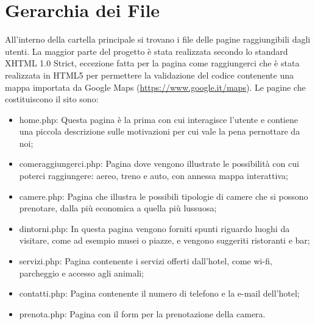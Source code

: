 \section{Gerarchia dei File}
All'interno della cartella principale si trovano i file delle pagine raggiungibili dagli utenti. La maggior parte del progetto è stata realizzata secondo lo standard XHTML 1.0 Strict, eccezione fatta per la pagina come raggiungerci che è stata realizzata in HTML5 per permettere la validazione del codice contenente una mappa importata da Google Maps (\underline{\color{Blue}https://www.google.it/maps}).
Le pagine che costituiscono il sito sono:
\begin{itemize} 
\item home.php: Questa pagina è la prima con cui interagisce l'utente e contiene una piccola descrizione sulle motivazioni per cui vale la pena pernottare da noi;
\item comeraggiungerci.php: Pagina dove vengono illustrate le possibilità con cui poterci raggiungere: aereo, treno e auto, con annessa mappa interattiva;
\item camere.php: Pagina che illustra le possibili tipologie di camere che si possono prenotare, dalla più economica a quella più lussuosa;
\item dintorni.php: In questa pagina vengono forniti spunti riguardo luoghi da visitare, come ad esempio musei o piazze, e vengono suggeriti ristoranti e bar;
\item servizi.php: Pagina contenente i servizi offerti dall'hotel, come wi-fi, parcheggio e accesso agli animali;
\item contatti.php: Pagina contenente il numero di telefono e la e-mail dell'hotel;
\item prenota.php: Pagina con il form per la prenotazione della camera.
\end{itemize}

